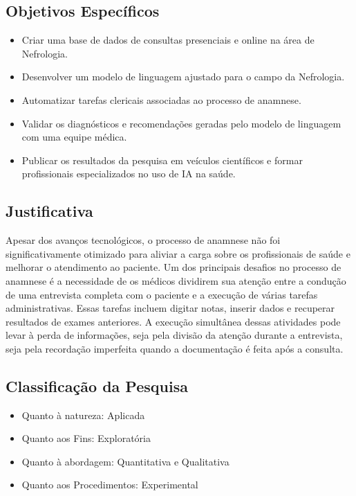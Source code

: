 \documentclass[
	article,
	11pt,
	oneside,
	a4paper,
	english,
	brazil,
	sumario=tradicional
	]{abntex2}
\begin{document}
\subsection{Objetivos Específicos}
\begin{itemize}[label=--] %
    \item Criar uma base de dados de consultas presenciais e online na área de Nefrologia.
    \item Desenvolver um modelo de linguagem ajustado para o campo da Nefrologia.
    \item Automatizar tarefas clericais associadas ao processo de anamnese.
    \item Validar os diagnósticos e recomendações geradas pelo modelo de linguagem com uma equipe médica.
    \item Publicar os resultados da pesquisa em veículos científicos e formar profissionais especializados no uso de IA na saúde.
\end{itemize}

\subsection{Justificativa}
Apesar dos avanços tecnológicos, o processo de anamnese não foi significativamente otimizado para aliviar a carga sobre os profissionais de saúde e melhorar o atendimento ao paciente. Um dos principais desafios no processo de anamnese é a necessidade de os médicos dividirem sua atenção entre a condução de uma entrevista completa com o paciente e a execução de várias tarefas administrativas. Essas tarefas incluem digitar notas, inserir dados e recuperar resultados de exames anteriores. A execução simultânea dessas atividades pode levar à perda de informações, seja pela divisão da atenção durante a entrevista, seja pela recordação imperfeita quando a documentação é feita após a consulta.

\subsection{Classificação da Pesquisa}
\begin{itemize}[label=--]
    \item Quanto à natureza: Aplicada
    \item Quanto aos Fins: Exploratória
    \item Quanto à abordagem: Quantitativa e Qualitativa
    \item Quanto aos Procedimentos: Experimental
\end{itemize}
\end{document}
